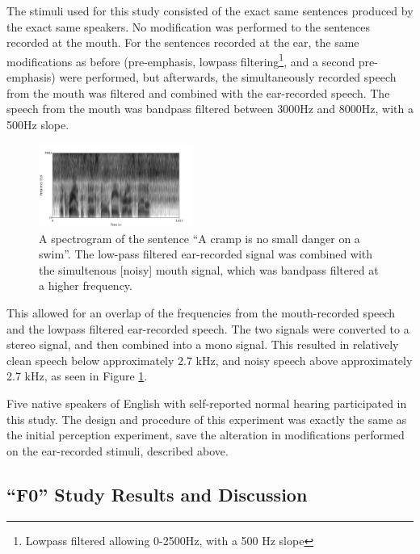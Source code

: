\documentclass[dissertation,copyright]{uathesis}
\begin{document}
The stimuli used for this study consisted of the exact same sentences produced by the exact same speakers.  No modification was performed to the sentences recorded at the mouth.  For the sentences recorded at the ear, the same modifications as before (pre-emphasis, lowpass filtering\footnote{Lowpass filtered allowing 0-2500Hz, with a 500 Hz slope}, and a second pre-emphasis) were performed, but afterwards, the simultaneously recorded speech from the mouth was filtered and combined with the ear-recorded speech.  The speech from the mouth was bandpass filtered between 3000Hz and 8000Hz, with a 500Hz slope.  
%
\begin{figure}
\centering
  \includegraphics[width=0.45\textwidth]{figure/combined-signal.png}
  \caption{A spectrogram of the sentence ``A cramp is no small danger on a swim''.  The low-pass filtered ear-recorded signal was combined with the simultenous [noisy] mouth signal, which was bandpass filtered at a higher frequency.}
  \label{fig:combined-signal}
\end{figure}
%
This allowed for an overlap of the frequencies from the mouth-recorded speech and the lowpass filtered ear-recorded speech.  The two signals were converted to a stereo signal, and then combined into a mono signal.  This resulted in relatively clean speech below approximately 2.7 kHz, and noisy speech above approximately 2.7 kHz, as seen in Figure \ref{fig:combined-signal}.

Five native speakers of English with self-reported normal hearing participated in this study.  The design and procedure of this experiment was exactly the same as the initial perception experiment, save the alteration in modifications performed on the ear-recorded stimuli, described above.


\subsection{``F0'' Study Results and Discussion}
\label{ch4:F0_discussion}


\end{document}
